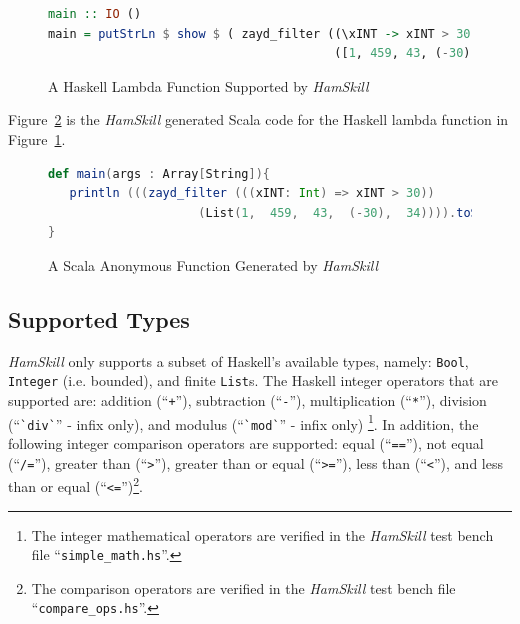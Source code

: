 \documentclass{report}
\begin{document}
\begin{figure}[H]
\begin{mdframed}
\begin{lstlisting}[language=Haskell, basicstyle=\scriptsize]
main :: IO ()
main = putStrLn $ show $ ( zayd_filter ((\xINT -> xINT > 30) ) 
                                        ([1, 459, 43, (-30), 34]))
\end{lstlisting}
\end{mdframed}
\caption{A Haskell Lambda Function Supported by \textit{HamSkill}}\label{fig:haskellLambdaFunction}
\end{figure}

Figure~\ref{fig:scalaLambdaFunction} is the \textit{HamSkill} generated Scala code for the Haskell lambda function in Figure~\ref{fig:haskellLambdaFunction}.

\begin{figure}[H]
\begin{mdframed}
\begin{lstlisting}[language=Scala, basicstyle=\scriptsize]
def main(args : Array[String]){
   println (((zayd_filter (((xINT: Int) => xINT > 30)) 
                     (List(1,  459,  43,  (-30),  34)))).toString())
} 
\end{lstlisting}
\end{mdframed}
\caption{A Scala Anonymous Function Generated by \textit{HamSkill}}\label{fig:scalaLambdaFunction}
\end{figure}

\subsection{Supported Types}\label{sec:supportedTypes}

\emph{HamSkill} only supports a subset of Haskell's available types, namely: \texttt{Bool}, \texttt{\tt Integer} (i.e. bounded), and finite \texttt{List}s.  The Haskell integer operators that are supported are: addition (``\texttt{+}''), subtraction (``\texttt{-}''), multiplication (``\texttt{*}''), division (``\texttt{\`{}div\`}'' - infix only), and modulus (``\texttt{\`{}mod\`}'' - infix only) \footnote{The integer mathematical operators are verified in the \textit{HamSkill} test bench file ``\texttt{simple\_math.hs}''.}.  In addition, the following integer comparison operators are supported: equal (``\texttt{==}''), not equal (``\texttt{/=}''), greater than (``\texttt{>}''), greater than or equal (``\texttt{>=}''), less than (``\texttt{<}''), and less than or equal (``\texttt{<=}'')\footnote{The comparison operators are verified in the \textit{HamSkill} test bench file ``\texttt{compare\_ops.hs}''.}.
\end{document}
